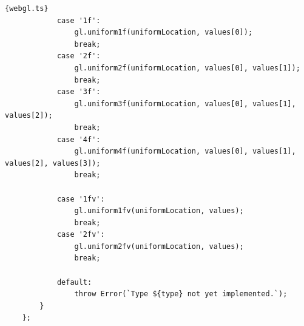 \begin{lstlisting}{webgl.ts}
            case '1f':
                gl.uniform1f(uniformLocation, values[0]);
                break;
            case '2f':
                gl.uniform2f(uniformLocation, values[0], values[1]);
                break;
            case '3f':
                gl.uniform3f(uniformLocation, values[0], values[1], values[2]);
                break;
            case '4f':
                gl.uniform4f(uniformLocation, values[0], values[1], values[2], values[3]);
                break;
    
            case '1fv':
                gl.uniform1fv(uniformLocation, values);
                break;
            case '2fv':
                gl.uniform2fv(uniformLocation, values);
                break;
    
            default:
                throw Error(`Type ${type} not yet implemented.`);
        }
    };       
\end{lstlisting}


